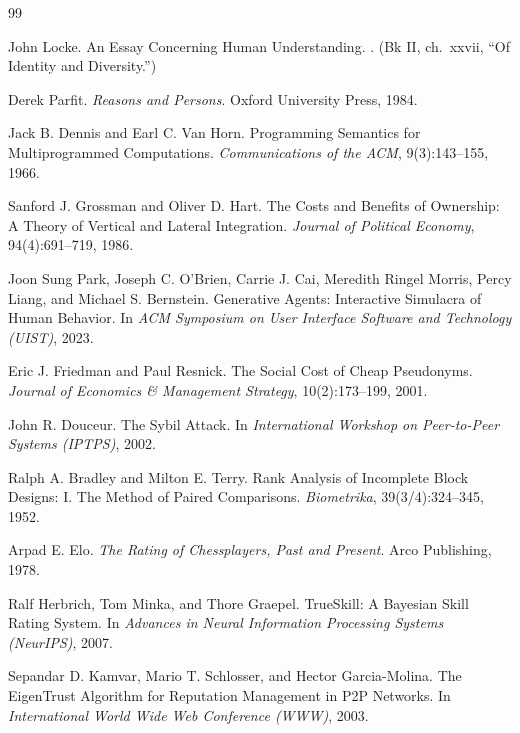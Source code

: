 \documentclass[11pt,a4paper]{article}
\theoremstyle{definition}
\begin{document}
\begin{thebibliography}{99}

John Locke.
\newblock An Essay Concerning Human Understanding.
. (Bk II, ch.\ xxvii, ``Of Identity and Diversity.'')

Derek Parfit.
\newblock \textit{Reasons and Persons}.
\newblock Oxford University Press, 1984.

Jack B. Dennis and Earl C. Van Horn.
\newblock Programming Semantics for Multiprogrammed Computations.
\newblock \textit{Communications of the ACM}, 9(3):143--155, 1966.

Sanford J. Grossman and Oliver D. Hart.
\newblock The Costs and Benefits of Ownership: A Theory of Vertical and Lateral Integration.
\newblock \textit{Journal of Political Economy}, 94(4):691--719, 1986.

Joon Sung Park, Joseph C. O'Brien, Carrie J. Cai, Meredith Ringel Morris, Percy Liang, and Michael S. Bernstein.
\newblock Generative Agents: Interactive Simulacra of Human Behavior.
\newblock In \textit{ACM Symposium on User Interface Software and Technology (UIST)}, 2023.

Eric J. Friedman and Paul Resnick.
\newblock The Social Cost of Cheap Pseudonyms.
\newblock \textit{Journal of Economics \& Management Strategy}, 10(2):173--199, 2001.

John R. Douceur.
\newblock The Sybil Attack.
\newblock In \textit{International Workshop on Peer-to-Peer Systems (IPTPS)}, 2002.

Ralph A. Bradley and Milton E. Terry.
\newblock Rank Analysis of Incomplete Block Designs: I. The Method of Paired Comparisons.
\newblock \textit{Biometrika}, 39(3/4):324--345, 1952.

Arpad E. Elo.
\newblock \textit{The Rating of Chessplayers, Past and Present}.
\newblock Arco Publishing, 1978.

Ralf Herbrich, Tom Minka, and Thore Graepel.
\newblock TrueSkill: A Bayesian Skill Rating System.
\newblock In \textit{Advances in Neural Information Processing Systems (NeurIPS)}, 2007.

Sepandar D. Kamvar, Mario T. Schlosser, and Hector Garcia-Molina.
\newblock The EigenTrust Algorithm for Reputation Management in P2P Networks.
\newblock In \textit{International World Wide Web Conference (WWW)}, 2003.


\end{thebibliography}
\end{document}
